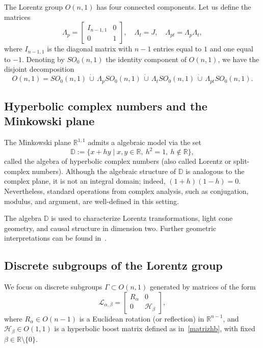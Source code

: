 \documentclass[]{article}
\begin{document}
The Lorentz group $O(n,1)$ has four connected components. Let us define the matrices
$$
\Lambda_p = \begin{bmatrix}
	I_{n-1,1} & 0 \\
	0 & 1
\end{bmatrix}, \quad
\Lambda_t = J, \quad
\Lambda_{pt} = \Lambda_p \Lambda_t,
$$
where $I_{n-1,1}$ is the diagonal matrix with $n-1$ entries equal to $1$ and one equal to $-1$. Denoting by $SO_0(n,1)$ the identity component of $O(n,1)$, we have the disjoint decomposition
$$
O(n,1) = SO_0(n,1) \,\dot\cup\, \Lambda_p SO_0(n,1) \,\dot\cup\, \Lambda_t SO_0(n,1) \,\dot\cup\, \Lambda_{pt} SO_0(n,1).
$$

\subsection*{Hyperbolic complex numbers and the Minkowski plane}

The Minkowski plane $\mathbb{R}^{1,1}$ admits a algebraic model via the set
$$
\mathbb{D} := \{x + h y \mid x, y \in \mathbb{R},\ h^2 = 1,\ h \notin \mathbb{R}\},
$$
called the algebra of hyperbolic complex numbers (also called Lorentz or split-complex numbers). Although the algebraic structure of $\mathbb{D}$ is analogous to the complex plane, it is not an integral domain; indeed, $(1 + h)(1 - h) = 0$. 
Nevertheless, standard operations from complex analysis, such as conjugation, modulus, and argument, are well-defined in this setting.

The algebra $\mathbb{D}$ is used to characterize Lorentz transformations, light cone geometry, and causal structure in dimension two. Further geometric interpretations can be found in~\cite{gurses2015one, harkin2004geometry, yaglom2014complex}.

\subsection*{Discrete subgroups of the Lorentz group}

We focus on discrete subgroups $\Gamma \subset O(n,1)$ generated by matrices of the form
$$
\mathcal{L}_{\alpha,\beta} =
\begin{bmatrix}
	R_\alpha & 0 \\
	0 & \mathcal{H}_\beta
\end{bmatrix},
$$
where $R_\alpha \in O(n-1)$ is a Euclidean rotation (or reflection) in $\mathbb{R}^{n-1}$, and $\mathcal{H}_\beta \in O(1,1)$ is a hyperbolic boost matrix defined as in~\eqref{matrizhb}, with fixed $\beta \in \mathbb{R} \setminus \{0\}$.
\end{document}
